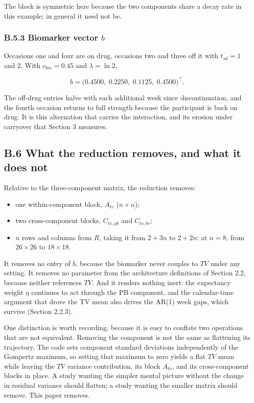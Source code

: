 \documentclass[
  11pt,
]{article}
\begin{document}
The block is symmetric here because the two components share a decay
rate in this example; in general it need not be.

\subsubsection{B.5.3 Biomarker vector $b$}

Occasions one and four are on drug, occasions two and three off it
with \(t_{sd} = 1\) and \(2\). With \(c_{bm} = 0.45\) and \(\lambda = \ln 2\),

\[
b = \bigl(0.4500,\; 0.2250,\; 0.1125,\; 0.4500\bigr)^{\!\top}.
\]

The off-drug entries halve with each additional week since
discontinuation, and the fourth occasion returns to full strength
because the participant is back on drug. It is this alternation that
carries the interaction, and its erosion under carryover that
Section 3 measures.

\subsection{B.6 What the reduction removes, and what it does not}

Relative to the three-component matrix, the reduction removes:

\begin{itemize}
\item one within-component block, $A_{tv}$ ($n \times n$);
\item two cross-component blocks, $C_{tv,pb}$ and $C_{tv,br}$;
\item $n$ rows and columns from $R$, taking it from $2+3n$ to
  $2+2n$: at $n = 8$, from $26 \times 26$ to $18 \times 18$.
\end{itemize}

It removes no entry of \(b\), because the biomarker never couples to
\(TV\) under any setting. It removes no parameter from the architecture
definitions of Section 2.2, because neither references \(TV\). And it
renders nothing inert: the expectancy weight \(\eta\) continues to act
through the PB component, and the calendar-time argument that drove
the TV mean also drives the AR(1) week gaps, which survive
(Section 2.2.3).

One distinction is worth recording, because it is easy to conflate
two operations that are not equivalent. Removing the component is not
the same as flattening its trajectory. The code sets component
standard deviations independently of the Gompertz maximum, so setting
that maximum to zero yields a flat \(TV\) mean while leaving the \(TV\)
variance contribution, its block \(A_{tv}\), and its cross-component
blocks in place. A study wanting the simpler mental picture without
the change in residual variance should flatten; a study wanting the
smaller matrix should remove. This paper removes.
\end{document}
